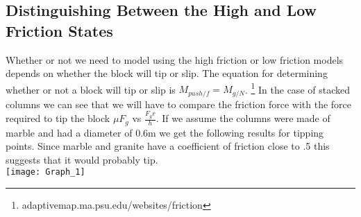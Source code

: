 \documentclass{article}
\begin{document}
\subsection*{Distinguishing Between the High and Low Friction States}
Whether or not we need to model using the high friction or low friction models depends on whether the block will tip or slip. The equation for determining whether or not a block will tip or slip is $M_{push/f}=M_{g/N}$. \footnote{adaptivemap.ma.psu.edu/websites/friction} In the case of stacked columns we can see that we will have to compare the friction force with the force required to tip the block $\mu F_g$ vs $\frac{F_{g}r}{h}$. If we assume the columns were made of marble and had a diameter of $0.6$m we get the following results for tipping points. Since marble and granite have a coefficient of friction close to .5 this suggests that it would probably tip.\\
\texttt{[image: Graph\_1]}
\end{document}
